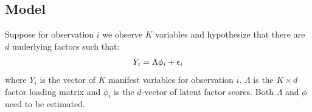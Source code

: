 \documentclass[letterpaper,10pt,english]{sphinxmanual}
\begin{document}
\subsection{Model}
\label{vignette:id70}
Suppose for observation \(i\) we observe \(K\) variables and
hypothesize that there are \(d\) underlying factors such that:
\begin{gather}
\begin{split}\begin{aligned}
Y_i = \Lambda \phi_i+\epsilon_i\end{aligned}\end{split}\notag
\end{gather}
where \(Y_{i}\) is the vector of \(K\) manifest variables for
observation \(i\). \(\Lambda\) is the \(K \times d\) factor
loading matrix and \(\phi_i\) is the \(d\)-vector of latent
factor scores. Both \(\Lambda\) and \(\phi\) need to be
estimated.
\end{document}
